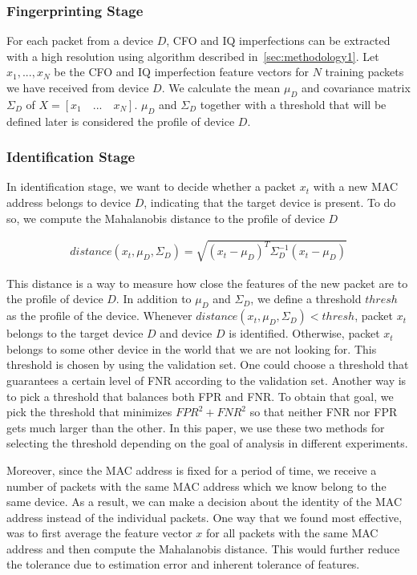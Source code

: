 \subsubsection*{\textbf{Fingerprinting Stage}}
For each packet from a device $D$, CFO and IQ imperfections can be extracted with a high resolution using algorithm described in~\ref{sec:methodology1}. Let $x_1,...,x_N$ be the CFO and IQ imperfection feature vectors for $N$ training packets we have received from device $D$. We calculate the mean $\mu_D$ and covariance matrix $\Sigma_D$ of $X = [x_1 \quad ... \quad x_N]$. $\mu_D$ and $\Sigma_D$ together with a threshold that will be defined later is considered the profile of device $D$.

\subsubsection*{\textbf{Identification Stage}}
In identification stage, we want to decide whether a packet $x_t$ with a new MAC address belongs to device $D$, indicating that the target device is present. To do so, we compute the Mahalanobis distance to the profile of device $D$

\begin{gather*}
    distance(x_t,\mu_D,\Sigma_D) = \sqrt{(x_t-\mu_D)^T\Sigma_D^{-1}(x_t-\mu_D)}
\end{gather*}


This distance is a way to measure how close the features of the new packet are to the profile of device $D$. In addition to $\mu_D$ and $\Sigma_D$, we define a threshold $thresh$ as the profile of the device. Whenever $distance(x_t,\mu_D,\Sigma_D)<thresh$, packet $x_t$ belongs to the target device $D$ and device $D$ is identified. Otherwise, packet $x_t$ belongs to some other device in the world that we are not looking for. This threshold is chosen by using the validation set. One could choose a threshold that guarantees a certain level of FNR according to the validation set. Another way is to pick a threshold that balances both FPR and FNR. To obtain that goal, we pick the threshold that minimizes $FPR^2+FNR^2$ so that neither FNR nor FPR gets much larger than the other. In this paper, we use these two methods for selecting the threshold depending on the goal of analysis in different experiments.


Moreover, since the MAC address is fixed for a period of time, we receive a number of packets with the same MAC address which we know belong to the same device. As a result, we can make a decision about the identity of the MAC address instead of the individual packets. One way that we found most effective, was to first average the feature vector $x$ for all packets with the same MAC address and then compute the Mahalanobis distance. This would further reduce the tolerance due to estimation error and inherent tolerance of features.

